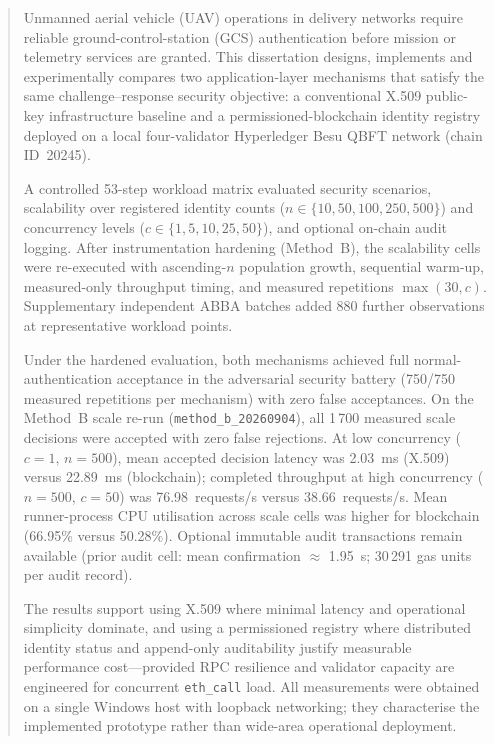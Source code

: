 
\begin{abstract}
Unmanned aerial vehicle (UAV) operations in delivery networks require reliable ground-control-station (GCS) authentication before mission or telemetry services are granted. This dissertation designs, implements and experimentally compares two application-layer mechanisms that satisfy the same challenge--response security objective: a conventional X.509 public-key infrastructure baseline and a permissioned-blockchain identity registry deployed on a local four-validator Hyperledger Besu QBFT network (chain ID~20245).

A controlled 53-step workload matrix evaluated security scenarios, scalability over registered identity counts ($n \in \{10,50,100,250,500\}$) and concurrency levels ($c \in \{1,5,10,25,50\}$), and optional on-chain audit logging. After instrumentation hardening (Method~B), the scalability cells were re-executed with ascending-$n$ population growth, sequential warm-up, measured-only throughput timing, and measured repetitions $\max(30,c)$. Supplementary independent ABBA batches added 880 further observations at representative workload points.

Under the hardened evaluation, both mechanisms achieved full normal-authentication acceptance in the adversarial security battery (750/750 measured repetitions per mechanism) with zero false acceptances. On the Method~B scale re-run (\texttt{method\_b\_20260904}), all 1\,700 measured scale decisions were accepted with zero false rejections. At low concurrency ($c=1$, $n=500$), mean accepted decision latency was 2.03~ms (X.509) versus 22.89~ms (blockchain); completed throughput at high concurrency ($n=500$, $c=50$) was 76.98~requests/s versus 38.66~requests/s. Mean runner-process CPU utilisation across scale cells was higher for blockchain (66.95\% versus 50.28\%). Optional immutable audit transactions remain available (prior audit cell: mean confirmation $\approx$ 1.95~s; 30\,291 gas units per audit record).

The results support using X.509 where minimal latency and operational simplicity dominate, and using a permissioned registry where distributed identity status and append-only auditability justify measurable performance cost---provided RPC resilience and validator capacity are engineered for concurrent \texttt{eth\_call} load. All measurements were obtained on a single Windows host with loopback networking; they characterise the implemented prototype rather than wide-area operational deployment.
\end{abstract}
